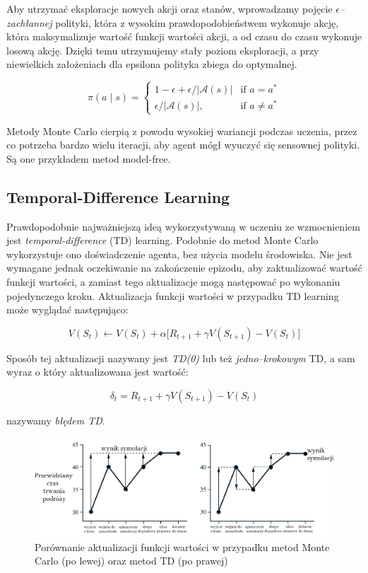 \documentclass[licencjacka]{pracamgr}
\begin{document}
Aby utrzymać eksploracje nowych akcji oraz stanów, wprowadzamy pojęcie \emph{$\epsilon$--zachłannej} polityki, która z wysokim prawdopodobieństwem wykonuje akcję, która maksymalizuje wartość funkcji wartości akcji, a od czasu do czasu wykonuje losową akcję. Dzięki temu utrzymujemy stały poziom eksploracji, a przy niewielkich założeniach dla epsilona polityka zbiega do optymalnej.

$$
\pi(a \mid s) =
\begin{cases}
    1 - \epsilon + \epsilon/\lvert \mathcal{A}(s) \rvert & \text{if } a = a^\ast \\
    \epsilon/\lvert \mathcal{A}(s) \rvert,              & \text{if } a\neq a^\ast
\end{cases}
$$

Metody Monte Carlo cierpią z powodu wysokiej wariancji podczas uczenia, przez co potrzeba bardzo wielu iteracji, aby agent mógł wyuczyć się sensownej polityki. Są one przykładem metod model-free.

\subsection{Temporal-Difference Learning} 

Prawdopodobnie najważniejszą ideą wykorzystywaną  w uczeniu ze wzmocnieniem jest \emph{temporal-difference} (TD) learning. Podobnie do metod Monte Carlo wykorzystuje ono doświadczenie agenta, bez użycia modelu środowiska. Nie jest wymagane jednak oczekiwanie na zakończenie epizodu, aby zaktualizować wartość funkcji wartości, a zamiast tego aktualizacje mogą następować po wykonaniu pojedynczego kroku. Aktualizacja funkcji wartości w przypadku TD learning może wyglądać następująco:

$$ V(S_t) \leftarrow V(S_t) + \alpha \big[R_{t+1} + \gamma V(S_{t+1}) - V(S_t) \big] $$

Sposób tej aktualizacji nazywany jest \emph{TD(0)} lub też \emph{jedno--krokowym} TD, a sam wyraz o który aktualizowana jest wartość:

$$ \delta_t = R_{t+1} + \gamma V(S_{t+1}) - V(S_t) $$

nazywamy \emph{błędem TD}.

\begin{figure}[ht]
  \centering
  \includegraphics[width=1.0\textwidth]{mc_td}
  \caption{Porównanie aktualizacji funkcji wartości w przypadku metod Monte Carlo (po lewej) oraz metod TD (po prawej)}
\end{figure}
\end{document}

